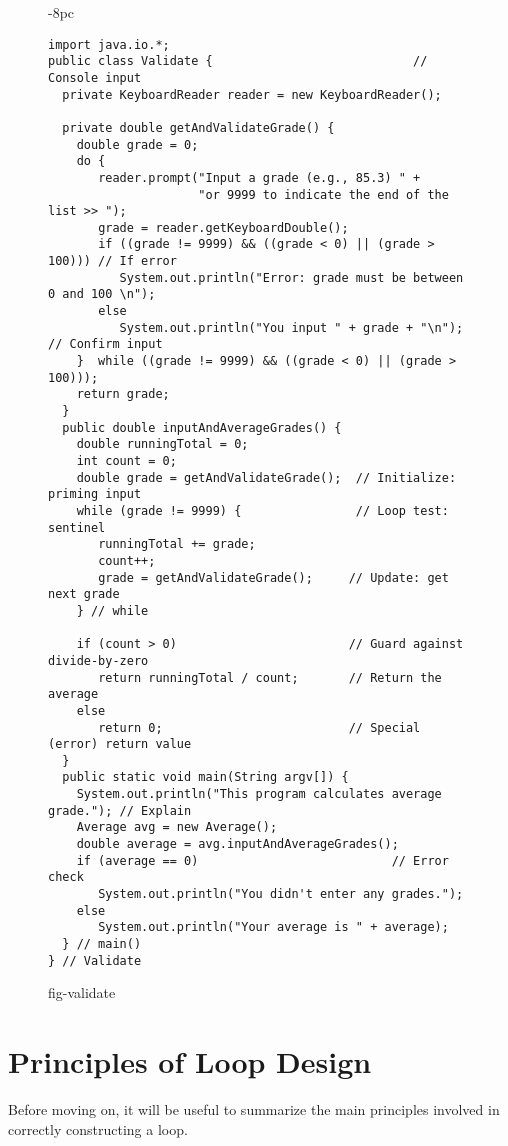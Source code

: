 \begin{figure}[p]
\jjjprogstart
\begin{jjjlistingleft}[34pc]{-8pc}
\begin{lstlisting}
import java.io.*;
public class Validate {                            // Console input
  private KeyboardReader reader = new KeyboardReader();  

  private double getAndValidateGrade() {
    double grade = 0;
    do {
       reader.prompt("Input a grade (e.g., 85.3) " +
                     "or 9999 to indicate the end of the list >> ");
       grade = reader.getKeyboardDouble();
       if ((grade != 9999) && ((grade < 0) || (grade > 100))) // If error
          System.out.println("Error: grade must be between 0 and 100 \n");  
       else
          System.out.println("You input " + grade + "\n");  // Confirm input
    }  while ((grade != 9999) && ((grade < 0) || (grade > 100)));
    return grade;
  }
  public double inputAndAverageGrades() {
    double runningTotal = 0;
    int count = 0;
    double grade = getAndValidateGrade();  // Initialize: priming input
    while (grade != 9999) {                // Loop test: sentinel
       runningTotal += grade;                            
       count++;                                          
       grade = getAndValidateGrade();     // Update: get next grade
    } // while

    if (count > 0)                        // Guard against divide-by-zero
       return runningTotal / count;       // Return the average
    else
       return 0;                          // Special (error) return value
  }
  public static void main(String argv[]) {
    System.out.println("This program calculates average grade."); // Explain
    Average avg = new Average();
    double average = avg.inputAndAverageGrades();
    if (average == 0)                           // Error check
       System.out.println("You didn't enter any grades.");
    else
       System.out.println("Your average is " + average);        
  } // main()
} // Validate
\end{lstlisting}
\end{jjjlistingleft}
{fig-validate}
\end{figure}

\section{Principles of Loop Design}
\noindent Before moving on, it will be useful to summarize the main
principles involved in correctly
constructing a loop.

